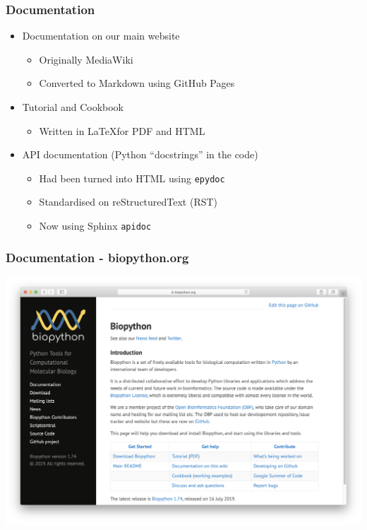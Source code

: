 \begin{frame}
\frametitle{Documentation}
\begin{itemize}
\item Documentation on our main website
  \begin{itemize}
  \item Originally MediaWiki
  \item Converted to Markdown using GitHub Pages
  \end{itemize}
\item Tutorial and Cookbook
  \begin{itemize}
  \item Written in \LaTeX for PDF and HTML
  \end{itemize}
\item API documentation (Python ``docstrings'' in the code)
  \begin{itemize}
  \item Had been turned into HTML using \texttt{epydoc}
  \item Standardised on reStructuredText (RST)
  \item Now using Sphinx \texttt{apidoc}
  \end{itemize}
\end{itemize}
\end{frame}

\begin{frame}
\frametitle{Documentation - biopython.org}
\vspace{-0.8cm}
\includegraphics[width=\textwidth]{images/main}
\end{frame}


